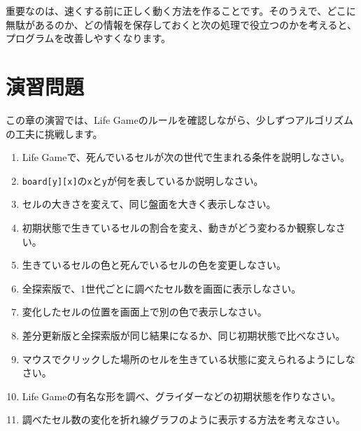重要なのは、速くする前に正しく動く方法を作ることです。そのうえで、どこに無駄があるのか、どの情報を保存しておくと次の処理で役立つのかを考えると、プログラムを改善しやすくなります。

\section{演習問題}

この章の演習では、Life Gameのルールを確認しながら、少しずつアルゴリズムの工夫に挑戦します。

\begin{enumerate}
    \item Life Gameで、死んでいるセルが次の世代で生まれる条件を説明しなさい。
    \item \texttt{board[y][x]}の\texttt{x}と\texttt{y}が何を表しているか説明しなさい。
    \item セルの大きさを変えて、同じ盤面を大きく表示しなさい。
    \item 初期状態で生きているセルの割合を変え、動きがどう変わるか観察しなさい。
    \item 生きているセルの色と死んでいるセルの色を変更しなさい。
    \item 全探索版で、1世代ごとに調べたセル数を画面に表示しなさい。
    \item 変化したセルの位置を画面上で別の色で表示しなさい。
    \item 差分更新版と全探索版が同じ結果になるか、同じ初期状態で比べなさい。
    \item マウスでクリックした場所のセルを生きている状態に変えられるようにしなさい。
    \item Life Gameの有名な形を調べ、グライダーなどの初期状態を作りなさい。
    \item 調べたセル数の変化を折れ線グラフのように表示する方法を考えなさい。
\end{enumerate}
